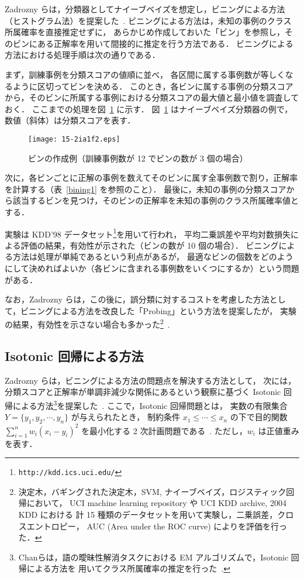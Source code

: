 \documentclass[japanese]{jnlp_1.4}
\begin{document}
Zadrozny らは，分類器としてナイーブベイズを想定し，ビニングによる方法（ヒストグラム法）を提案した~\cite{Zadrozny01a,Zadrozny01b}. 
ビニングによる方法は，未知の事例のクラス所属確率を直接推定せずに，
あらかじめ作成しておいた「ビン」を参照し，そのビンにある正解率を用いて間接的に推定を行う方法である．
ビニングによる方法における処理手順は次の通りである．

まず，訓練事例を分類スコアの値順に並べ，
各区間に属する事例数が等しくなるように区切ってビンを決める．
このとき，各ビンに属する事例の分類スコアから，そのビンに所属する事例における分類スコアの最大値と最小値を調査しておく．
ここまでの処理を図~\ref{bining} に示す．
図~\ref{bining} はナイーブベイズ分類器の例で，数値（斜体）は分類スコアを表す．


\begin{figure}[b]
  \begin{center}
\texttt{[image: 15-2ia1f2.eps]}
\caption{ビンの作成例（訓練事例数が 12 でビンの数が 3 個の場合）}
\label{bining}
  \end{center}
\end{figure}


次に，各ビンごとに正解の事例を数えてそのビンに属す全事例数で割り，正解率を計算する（表~\ref{bining1} を参照のこと）．
最後に，未知の事例の分類スコアから該当するビンを見つけ，そのビンの正解率を未知の事例のクラス所属確率値とする．

実験は KDD'98 データセット\footnote{
	\texttt{http://kdd.ics.uci.edu/}
}を用いて行われ，
平均二乗誤差や平均対数損失による評価の結果，有効性が示された（ビンの数が 10 個の場合）．
ビニングによる方法は処理が単純であるという利点があるが，
最適なビンの個数をどのようにして決めればよいか（各ビンに含まれる事例数をいくつにするか）という問題がある．

なお，Zadrozny らは，この後に，誤分類に対するコストを考慮した方法として，ビニングによる方法を改良した「Probing」という方法を提案したが，
実験の結果，有効性を示さない場合も多かった\footnote{
	決定木，バギングされた決定木，SVM, ナイーブベイズ，ロジスティック回帰において，
	UCI machine learning repository や UCI KDD archive, 2004 KDD における
	計 15 種類のデータセットを用いて実験し，二乗誤差，クロスエントロピー，
	AUC (Area under the ROC curve) によりを評価を行った．
}~\cite{Zadrozny05}. 

\subsection{Isotonic 回帰による方法}

Zadrozny らは，ビニングによる方法の問題点を解決する方法として，
次には，分類スコアと正解率が単調非減少な関係にあるという観察に基づく Isotonic 回帰による方法\footnote{
	Chanらは，語の曖昧性解消タスクにおける EM アルゴリズムで，Isotonic 回帰による方法を
	用いてクラス所属確率の推定を行った~\cite{Chan06}.
}を提案した~\cite{Zadrozny02}. 
ここで，Isotonic 回帰問題とは，
実数の有限集合 $Y=\{y_{1}, y_{2}, \cdots, y_{n}\}$ が与えられたとき，
制約条件 $x_{1}\le \cdots \le x_{n}$ の下で目的関数 $\sum_{i = 1}^{n} w_i(x_i - y_i)^{2}$ を最小化する 2 次計画問題である~\cite{Kearsley96}. 
ただし，$w_i$ は正値重みを表す．
\end{document}
